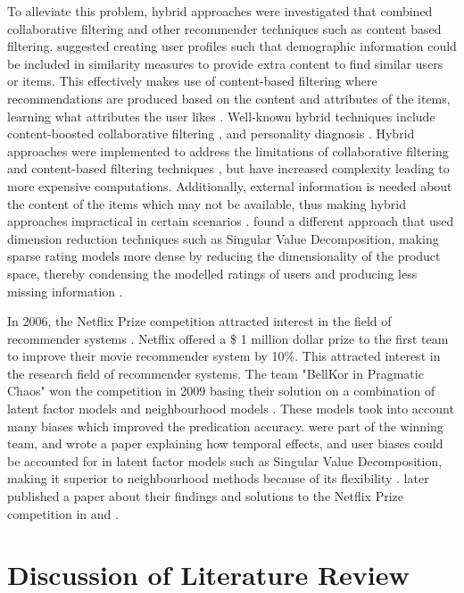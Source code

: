 To alleviate this problem, hybrid approaches were investigated that combined collaborative filtering and other recommender techniques such as content based filtering. \citeauthor{toward} suggested creating user profiles such that demographic information could be included in similarity measures to provide extra content to find similar users or items. This effectively makes use of content-based filtering where recommendations are produced based on the content and attributes of the items, learning what attributes the user likes \cite{toward}. Well-known hybrid techniques include content-boosted collaborative filtering \cite{hybrid}, and personality diagnosis \cite{hybrid2, survey}. Hybrid approaches were implemented to address the limitations of collaborative filtering and content-based filtering techniques \cite{toward}, but have increased complexity leading to more expensive computations. Additionally, external information is needed about the content of the items which may not be available, thus making hybrid approaches impractical in certain scenarios \cite{survey}. \citeauthor{dimension} found a different approach that used dimension reduction techniques such as Singular Value Decomposition, making sparse rating models more dense by reducing the dimensionality of the product space, thereby condensing the modelled ratings of users and producing less missing information \cite{dimension}. 

In 2006, the Netflix Prize competition attracted interest in the field of recommender systems \cite{survey}. Netflix offered a \$ 1 million dollar prize to the first team to improve their movie recommender system by 10\%. This attracted interest in the research field of recommender systems. The team "BellKor in Pragmatic Chaos" won the competition in 2009 basing their solution on a combination of latent factor models and neighbourhood models \cite{winning, survey}. These models took into account many biases which improved the predication accuracy. \citeauthor{koren2009matrix} were part of the winning team, and wrote a paper explaining how temporal effects, and user biases could be accounted for in latent factor models such as Singular Value Decomposition, making it superior to neighbourhood methods because of its flexibility \cite{koren2009matrix}. \citeauthor{koren2011} later published a paper about their findings and solutions to the Netflix Prize competition in \cite{koren2011} and \cite{winners}.


\section{Discussion of Literature Review}

